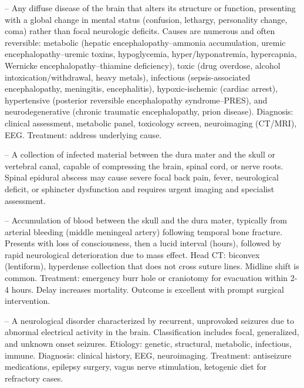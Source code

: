 -- Any diffuse disease of the brain that alters its structure or function, presenting with a global change in mental status (confusion, lethargy, personality change, coma) rather than focal neurologic deficits. Causes are numerous and often reversible: metabolic (hepatic encephalopathy--ammonia accumulation, uremic encephalopathy--uremic toxins, hypoglycemia, hyper/hyponatremia, hypercapnia, Wernicke encephalopathy--thiamine deficiency), toxic (drug overdose, alcohol intoxication/withdrawal, heavy metals), infectious (sepsis-associated encephalopathy, meningitis, encephalitis), hypoxic-ischemic (cardiac arrest), hypertensive (posterior reversible encephalopathy syndrome--PRES), and neurodegenerative (chronic traumatic encephalopathy, prion disease). Diagnosis: clinical assessment, metabolic panel, toxicology screen, neuroimaging (CT/MRI), EEG. Treatment: address underlying cause.

-- A collection of infected material between the dura mater and the skull or vertebral canal, capable of compressing the brain, spinal cord, or nerve roots. Spinal epidural abscess may cause severe focal back pain, fever, neurological deficit, or sphincter dysfunction and requires urgent imaging and specialist assessment.

-- Accumulation of blood between the skull and the dura mater, typically from arterial bleeding (middle meningeal artery) following temporal bone fracture. Presents with loss of consciousness, then a lucid interval (hours), followed by rapid neurological deterioration due to mass effect. Head CT: biconvex (lentiform), hyperdense collection that does not cross suture lines. Midline shift is common. Treatment: emergency burr hole or craniotomy for evacuation within 2-4 hours. Delay increases mortality. Outcome is excellent with prompt surgical intervention.

-- A neurological disorder characterized by recurrent, unprovoked seizures due to abnormal electrical activity in the brain. Classification includes focal, generalized, and unknown onset seizures. Etiology: genetic, structural, metabolic, infectious, immune. Diagnosis: clinical history, EEG, neuroimaging. Treatment: antiseizure medications, epilepsy surgery, vagus nerve stimulation, ketogenic diet for refractory cases.

